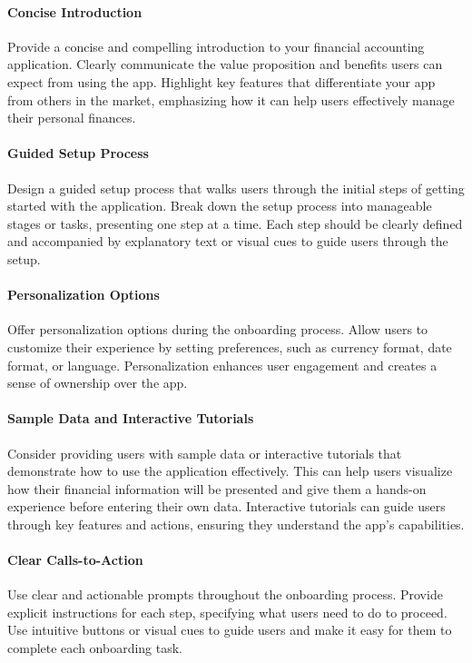 \paragraph{Concise Introduction}
Provide a concise and compelling introduction to your financial accounting application. Clearly 
communicate the value proposition and benefits users can expect from using the app. Highlight key features that 
differentiate your app from others in the market, emphasizing how it can help users effectively manage their personal 
finances.

\paragraph{Guided Setup Process}
Design a guided setup process that walks users through the initial steps of getting started with 
the application. Break down the setup process into manageable stages or tasks, presenting one step at a time. Each 
step should be clearly defined and accompanied by explanatory text or visual cues to guide users through the setup.

\paragraph{Personalization Options}
Offer personalization options during the onboarding process. Allow users to 
customize their experience by setting preferences, such as currency format, date format, or language. Personalization 
enhances user engagement and creates a sense of ownership over the app.

\paragraph{Sample Data and Interactive Tutorials}
Consider providing users with sample data or interactive tutorials that 
demonstrate how to use the application effectively. This can help users visualize how their financial information 
will be presented and give them a hands-on experience before entering their own data. Interactive tutorials can 
guide users through key features and actions, ensuring they understand the app's capabilities.

\paragraph{Clear Calls-to-Action}
Use clear and actionable prompts throughout the onboarding process. Provide explicit 
instructions for each step, specifying what users need to do to proceed. Use intuitive buttons or visual cues 
to guide users and make it easy for them to complete each onboarding task.


